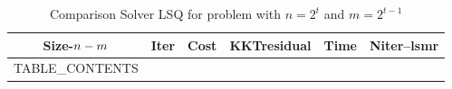 \documentclass[letterpaper,12pt,oneside,final]{book}
\begin{document}
\begin{table}
\caption{ Comparison Solver LSQ  for  problem with $n=2^{t}$ and $m=2^{t-1}$  } 
\begin{center}
\begin{tabular}{|*{6}{c}|} \hline
Size-$n\--m$ & \multicolumn{1}{c}{Iter} & \multicolumn{1}{c}{Cost}& \multicolumn{1}{c}{KKTresidual} & \multicolumn{1}{c}{Time} & \multicolumn{1}{c|}{Niter--lsmr} \\ 
\hline

TABLE_CONTENTS 

\hline
\end{tabular}
\end{center}
\end{table}
\end{document}
